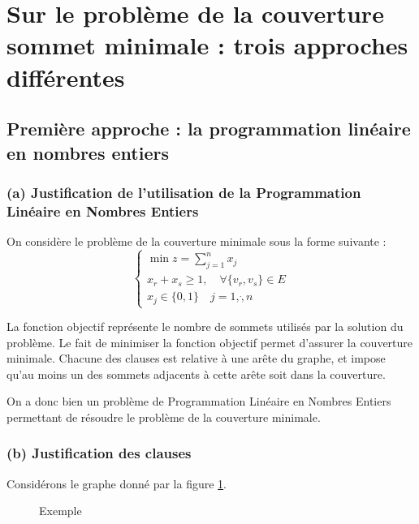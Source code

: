 \section{Sur le problème de la couverture sommet minimale : trois approches différentes}

\subsection{Première approche : la programmation linéaire en nombres entiers}

\subsubsection{(a) Justification de l'utilisation de la Programmation Linéaire en Nombres Entiers}

On considère le problème de la couverture minimale sous la forme suivante : $$
\left \lbrace \begin{array}{l}
	\min z = \sum\limits_{j=1}^n x_j\\
	x_r + x_s \geq 1, \quad \forall \{v_r, v_s\} \in E \\
	x_j \in \{0,1\} \quad j = 1, \dot, n
\end{array} \right .
$$

La fonction objectif représente le nombre de sommets utilisés par la solution du problème. Le fait
de minimiser la fonction objectif permet d'assurer la couverture minimale. Chacune des clauses est
relative à une arête du graphe, et impose qu'au moins un des sommets adjacents à cette arête soit
dans la couverture.

On a donc bien un problème de Programmation Linéaire en Nombres Entiers permettant de résoudre le problème de la couverture minimale.

\subsubsection{(b) Justification des clauses}

Considérons le graphe donné par la figure \ref{triangle}. 

\begin{figure}
	\begin{center}
	\end{center}
	\label{triangle}
	\caption{Exemple}
\end{figure}

